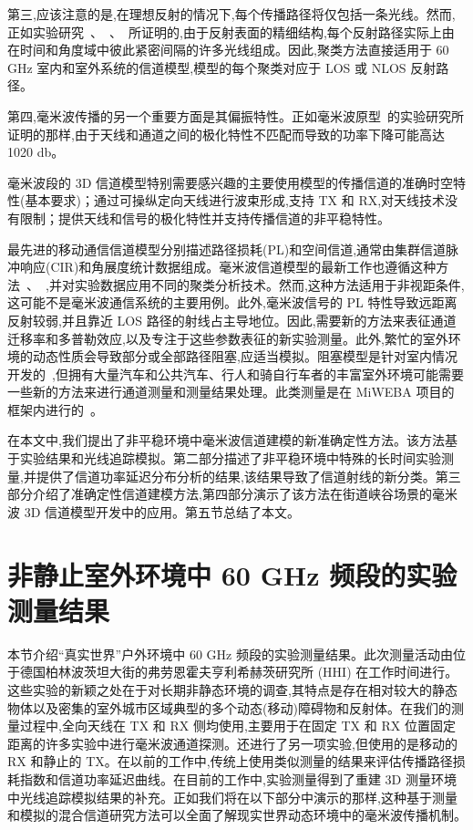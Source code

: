 第三,应该注意的是,在理想反射的情况下,每个传播路径将仅包括一条光线。然而,正如实验研究~\cite{keusgen2013}、~\cite{maltsev2009}、~\cite{sawada2010}所证明的,由于反射表面的精细结构,每个反射路径实际上由在时间和角度域中彼此紧密间隔的许多光线组成。因此,聚类方法直接适用于 60 GHz 室内和室外系统的信道模型,模型的每个聚类对应于 LOS 或 NLOS 反射路径。

第四,毫米波传播的另一个重要方面是其偏振特性。正如毫米波原型~\cite{maltsev2010}的实验研究所证明的那样,由于天线和通道之间的极化特性不匹配而导致的功率下降可能高达 1020 db。

毫米波段的 3D 信道模型特别需要感兴趣的主要使用模型的传播信道的准确时空特性(基本要求)；通过可操纵定向天线进行波束形成,支持 TX 和 RX,对天线技术没有限制；提供天线和信号的极化特性并支持传播信道的非平稳特性。

最先进的移动通信信道模型分别描述路径损耗(PL)和空间信道,通常由集群信道脉冲响应(CIR)和角展度统计数据组成。毫米波信道模型的最新工作也遵循这种方法~\cite{rappaport2013b}、~\cite{khan2011},并对实验数据应用不同的聚类分析技术。然而,这种方法适用于非视距条件,这可能不是毫米波通信系统的主要用例。此外,毫米波信号的 PL 特性导致远距离反射较弱,并且靠近 LOS 路径的射线占主导地位。因此,需要新的方法来表征通道迁移率和多普勒效应,以及专注于这些参数表征的新实验测量。此外,繁忙的室外环境的动态性质会导致部分或全部路径阻塞,应适当模拟。阻塞模型是针对室内情况开发的~\cite{jacob2011},但拥有大量汽车和公共汽车、行人和骑自行车者的丰富室外环境可能需要一些新的方法来进行通道测量和测量结果处理。此类测量是在 MiWEBA 项目的框架内进行的~\cite{miweba2013}。

在本文中,我们提出了非平稳环境中毫米波信道建模的新准确定性方法。该方法基于实验结果和光线追踪模拟。第二部分描述了非平稳环境中特殊的长时间实验测量,并提供了信道功率延迟分布分析的结果,该结果导致了信道射线的新分类。第三部分介绍了准确定性信道建模方法,第四部分演示了该方法在街道峡谷场景的毫米波 3D 信道模型开发中的应用。第五节总结了本文。
\section{非静止室外环境中 60 GHz 频段的实验测量结果}
本节介绍“真实世界”户外环境中 60 GHz 频段的实验测量结果。此次测量活动由位于德国柏林波茨坦大街的弗劳恩霍夫亨利希赫茨研究所 (HHI) 在工作时间进行。这些实验的新颖之处在于对长期非静态环境的调查,其特点是存在相对较大的静态物体以及密集的室外城市区域典型的多个动态(移动)障碍物和反射体。在我们的测量过程中,全向天线在 TX 和 RX 侧均使用,主要用于在固定 TX 和 RX 位置固定距离的许多实验中进行毫米波通道探测。还进行了另一项实验,但使用的是移动的 RX 和静止的 TX。在以前的工作中,传统上使用类似测量的结果来评估传播路径损耗指数和信道功率延迟曲线。在目前的工作中,实验测量得到了重建 3D 测量环境中光线追踪模拟结果的补充。正如我们将在以下部分中演示的那样,这种基于测量和模拟的混合信道研究方法可以全面了解现实世界动态环境中的毫米波传播机制。
